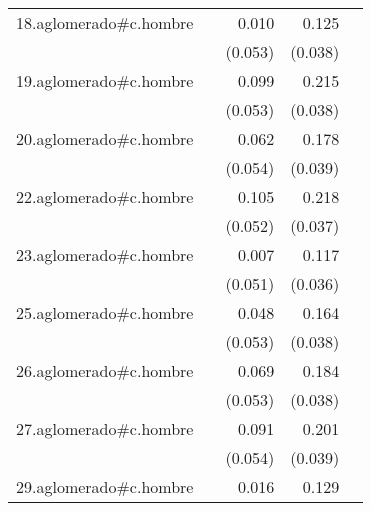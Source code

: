 {\begin{longtable}{l*{4}{D{.}{.}{-1}}}
\addlinespace
18.aglomerado#c.hombre&                     &       0.010         &       0.125\sym{**} &                     \\
            &                     &     (0.053)         &     (0.038)         &                     \\
\addlinespace
19.aglomerado#c.hombre&                     &       0.099         &       0.215\sym{***}&                     \\
            &                     &     (0.053)         &     (0.038)         &                     \\
\addlinespace
20.aglomerado#c.hombre&                     &       0.062         &       0.178\sym{***}&                     \\
            &                     &     (0.054)         &     (0.039)         &                     \\
\addlinespace
22.aglomerado#c.hombre&                     &       0.105\sym{*}  &       0.218\sym{***}&                     \\
            &                     &     (0.052)         &     (0.037)         &                     \\
\addlinespace
23.aglomerado#c.hombre&                     &       0.007         &       0.117\sym{***}&                     \\
            &                     &     (0.051)         &     (0.036)         &                     \\
\addlinespace
25.aglomerado#c.hombre&                     &       0.048         &       0.164\sym{***}&                     \\
            &                     &     (0.053)         &     (0.038)         &                     \\
\addlinespace
26.aglomerado#c.hombre&                     &       0.069         &       0.184\sym{***}&                     \\
            &                     &     (0.053)         &     (0.038)         &                     \\
\addlinespace
27.aglomerado#c.hombre&                     &       0.091         &       0.201\sym{***}&                     \\
            &                     &     (0.054)         &     (0.039)         &                     \\
\addlinespace
29.aglomerado#c.hombre&                     &       0.016         &       0.129\sym{***}&                     \\

\end{longtable}}
